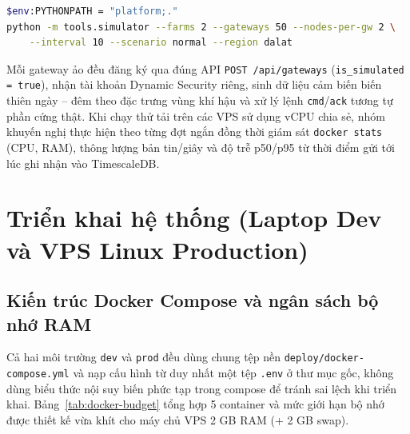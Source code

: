 \begin{lstlisting}[language=bash, caption={Lệnh chạy giả lập thử tải 50 gateway qua MQTT TLS}]
$env:PYTHONPATH = "platform;."
python -m tools.simulator --farms 2 --gateways 50 --nodes-per-gw 2 \
    --interval 10 --scenario normal --region dalat
\end{lstlisting}

Mỗi gateway ảo đều đăng ký qua đúng API \texttt{POST /api/gateways} (\texttt{is\_simulated = true}), nhận tài khoản Dynamic Security riêng, sinh dữ liệu cảm biến biến thiên ngày -- đêm theo đặc trưng vùng khí hậu và xử lý lệnh \texttt{cmd}/\texttt{ack} tương tự phần cứng thật. Khi chạy thử tải trên các VPS sử dụng vCPU chia sẻ, nhóm khuyến nghị thực hiện theo từng đợt ngắn đồng thời giám sát \texttt{docker stats} (CPU, RAM), thông lượng bản tin/giây và độ trễ p50/p95 từ thời điểm gửi tới lúc ghi nhận vào TimescaleDB.

\section{Triển khai hệ thống (Laptop Dev và VPS Linux Production)}
\label{sec:c4-deployment}

\subsection{Kiến trúc Docker Compose và ngân sách bộ nhớ RAM}
\label{subsec:c4-docker-budget}

Cả hai môi trường \texttt{dev} và \texttt{prod} đều dùng chung tệp nền \texttt{deploy/docker-compose.yml} và nạp cấu hình từ duy nhất một tệp \texttt{.env} ở thư mục gốc, không dùng biểu thức nội suy biến phức tạp trong compose để tránh sai lệch khi triển khai. Bảng~\ref{tab:docker-budget} tổng hợp 5 container và mức giới hạn bộ nhớ được thiết kế vừa khít cho máy chủ VPS 2 GB RAM (+ 2 GB swap).

